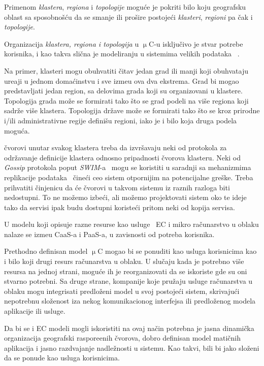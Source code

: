 Primenom  \emph{klastera}, \emph{regiona} i \emph{topologije} mogu\'ce je pokriti bilo koju geografsku oblast sa sposobno\v s\'cu da se smanje ili pro\v sire postoje\'ci \emph{klasteri}, \emph{regioni} pa \v cak i \emph{topologije}.  

Organizacija \emph{klastera, regiona i topologija} u $\upmu$C-u isklju\v civo je stvar potrebe korisnika, i kao takva sli\v cna je modeliranju u sistemima velikih podataka ~\cite{SonbolOAA20, WangCAL14}. 

Na primer, klasteri mogu obuhvatiti \v citav jedan grad ili manji koji obuhvataju ure\dj aji u jednom doma\'cinstvu i sve izme\dj u ova dva ekstrema. Grad bi mogao predstavljati jedan region, sa delovima grada koji su organizovani u klastere. Topologija grada mo\v ze se formirati tako \v sto se grad podeli na vi\v se regiona koji sadr\v ze vi\v se klastera. Topologija dr\v zave mo\v ze se formirati tako \v sto se kroz prirodne i/ili administrativne regije defini\v su regioni, iako je i bilo koja druga podela mogu\'ca.

\v cvorovi unutar svakog klastera treba da izvr\v savaju neki od protokola za odr\v zavanje definicije klastera odnosno pripadnosti \v cvorova klasteru. Neki od \textit{Gossip} protokola poput \textit{SWIM}-a~\cite{DasGM02} mogu se koristiti u saradnji sa mehanizmima replikacije podataka~\cite {LiBCL20, CauCBFCEB16, CRDTS_Nuno} \v cine\'ci ceo sistem otpornijim na potencijalne gre\v ske. Treba prihvatiti \v cinjenicu da \'ce \v cvorovi u takvom sistemu iz raznih razloga biti nedostupni. To ne mo\v zemo izbe\'ci, ali mo\v zemo projektovati sistem oko te ideje tako da servisi ipak budu dostupni koriste\'ci pritom neki od kopija servisa.

U modelu koji opisuje razne resurse kao usluge~\cite{DuanFZSNH15} EC i mikro ra\v cunarstvo u oblaku nalaze se izme\dj u CaaS-a i PaaS-a, u zavisnosti od potreba korisnika.

Prethodno definisan model $\upmu$C mogao bi se ponuditi kao usluga korisnicima kao i bilo koji drugi resurs ra\v cunarstva u oblaku. U slu\v caju kada je potrebno vi\v se resursa na jednoj strani, mogu\'ce ih je reorganizovati da se iskoriste gde su oni stvarno potrebni. Sa druge strane, kompanije koje pru\v zaju usluge ra\v cunarstva u oblaku mogu integrisati predlo\v zeni model u svoj postoje\'ci sistem, skrivaju\'ci nepotrebnu slo\v zenost iza nekog komunikacionog interfejsa ili predlo\v zenog modela aplikacije ili usluge.

Da bi se i EC modeli mogli iskoristiti na ovaj na\v cin potrebna je jasna dinami\v cka organizacija geografski raspore\dj enih \v cvorova, dobro definisan model mati\v cnih aplikacija i jasno razdvajanje nadle\v znosti u sistemu. Kao takvi, bili bi jako slo\v zeni da se ponude kao usluga korisnicima. 


